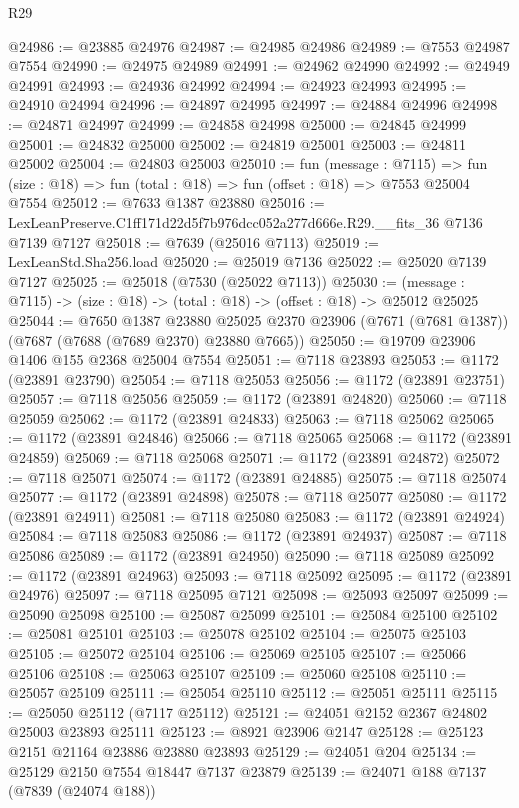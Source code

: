 \begin{lexlean}{R29}
\begin{coremodule}
@24986 := @23885 @24976
@24987 := @24985 @24986
@24989 := @7553 @24987 @7554
@24990 := @24975 @24989
@24991 := @24962 @24990
@24992 := @24949 @24991
@24993 := @24936 @24992
@24994 := @24923 @24993
@24995 := @24910 @24994
@24996 := @24897 @24995
@24997 := @24884 @24996
@24998 := @24871 @24997
@24999 := @24858 @24998
@25000 := @24845 @24999
@25001 := @24832 @25000
@25002 := @24819 @25001
@25003 := @24811 @25002
@25004 := @24803 @25003
@25010 := fun (message : @7115) =>
  fun (size : @18) => fun (total : @18) => fun (offset : @18) => @7553 @25004 @7554
@25012 := @7633 @1387 @23880
@25016 := LexLeanPreserve.C1ff171d22d5f7b976dcc052a277d666e.R29.__fits_36 @7136 @7139 @7127
@25018 := @7639 (@25016 @7113)
@25019 := LexLeanStd.Sha256.load
@25020 := @25019 @7136
@25022 := @25020 @7139 @7127
@25025 := @25018 (@7530 (@25022 @7113))
@25030 := (message : @7115) -> (size : @18) -> (total : @18) -> (offset : @18) -> @25012 @25025
@25044 := @7650
    @1387
    @23880
    @25025
    @2370
    @23906
    (@7671 (@7681 @1387))
    (@7687 (@7688 (@7689 @2370) @23880 @7665))
@25050 := @19709 @23906 @1406 @155 @2368 @25004 @7554
@25051 := @7118 @23893
@25053 := @1172 (@23891 @23790)
@25054 := @7118 @25053
@25056 := @1172 (@23891 @23751)
@25057 := @7118 @25056
@25059 := @1172 (@23891 @24820)
@25060 := @7118 @25059
@25062 := @1172 (@23891 @24833)
@25063 := @7118 @25062
@25065 := @1172 (@23891 @24846)
@25066 := @7118 @25065
@25068 := @1172 (@23891 @24859)
@25069 := @7118 @25068
@25071 := @1172 (@23891 @24872)
@25072 := @7118 @25071
@25074 := @1172 (@23891 @24885)
@25075 := @7118 @25074
@25077 := @1172 (@23891 @24898)
@25078 := @7118 @25077
@25080 := @1172 (@23891 @24911)
@25081 := @7118 @25080
@25083 := @1172 (@23891 @24924)
@25084 := @7118 @25083
@25086 := @1172 (@23891 @24937)
@25087 := @7118 @25086
@25089 := @1172 (@23891 @24950)
@25090 := @7118 @25089
@25092 := @1172 (@23891 @24963)
@25093 := @7118 @25092
@25095 := @1172 (@23891 @24976)
@25097 := @7118 @25095 @7121
@25098 := @25093 @25097
@25099 := @25090 @25098
@25100 := @25087 @25099
@25101 := @25084 @25100
@25102 := @25081 @25101
@25103 := @25078 @25102
@25104 := @25075 @25103
@25105 := @25072 @25104
@25106 := @25069 @25105
@25107 := @25066 @25106
@25108 := @25063 @25107
@25109 := @25060 @25108
@25110 := @25057 @25109
@25111 := @25054 @25110
@25112 := @25051 @25111
@25115 := @25050 @25112 (@7117 @25112)
@25121 := @24051 @2152 @2367 @24802 @25003 @23893 @25111
@25123 := @8921 @23906 @2147
@25128 := @25123 @2151 @21164 @23886 @23880 @23893
@25129 := @24051 @204
@25134 := @25129 @2150 @7554 @18447 @7137 @23879
@25139 := @24071 @188 @7137 (@7839 (@24074 @188))

\end{coremodule}
\end{lexlean}
